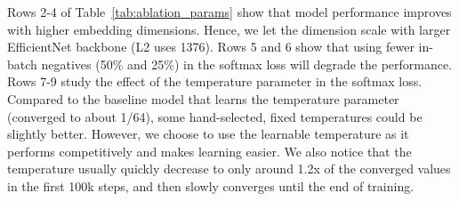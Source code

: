 \documentclass{article}
\begin{document}
Rows 2-4 of Table~\ref{tab:ablation_params} show that model performance improves with higher embedding dimensions. Hence, we let the dimension scale with larger EfficientNet backbone (L2 uses 1376).
Rows 5 and 6 show that using fewer in-batch negatives (50\% and 25\%) in the softmax loss will degrade the performance.
Rows 7-9 study the effect of the temperature parameter in the softmax loss. Compared to the baseline model that learns the temperature parameter (converged to about 1/64), some hand-selected, fixed temperatures could be slightly better. However, we choose to use the learnable temperature as it performs competitively and makes learning easier. We also notice that the temperature usually quickly decrease to only around 1.2x of the converged values in the first 100k steps, and then slowly converges until the end of training.
\end{document}
